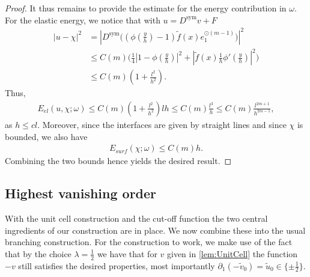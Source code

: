 \documentclass[a4paper, 10pt, twoside, notitlepage]{amsart}
\theoremstyle{plain}
\newcommand{\p}{\partial}
\newcommand{\Ds}{D^{\text{sym}}}
\begin{document}
\begin{proof}
			It thus remains to provide the estimate for the energy contribution in $\omega$.  For the elastic energy, we notice that with $u = \Ds v + F$
			\begin{align*}
                          |u - \chi|^2 &= \left|\Ds \Big((\phi(\frac{y}{h})-1)\tilde{f}(x) e_1^{\odot(m-1)}\Big) \right|^2 \\
                          &\leq C(m) \Big( \frac{1}{4} |1-\phi(\frac{y}{h})|^2 + |\tilde{f}(x) \frac{1}{h} \phi'(\frac{y}{h})|^2 \Big) \\
                          & \leq C(m)(1 + \frac{l^2}{h^{2}}).
			\end{align*}
			Thus,
			\begin{align*}
				E_{el}(u, \chi;\omega) \leq C(m) (1+\frac{l^2}{h^{2}}) l h \leq C(m) \frac{l^3}{h} \leq C(m) \frac{l^{2m+1}}{h^{2m-1}},
			\end{align*}
			as $h \leq c l$.  Moreover, since the interfaces are given by straight lines and since $\chi$ is bounded, we also have
			\begin{align*}
				E_{surf}(\chi;\omega) \leq C(m) h.
			\end{align*}
			Combining the two bounds hence yields the desired result.
		\end{proof}
		
		\subsection{Highest vanishing order}
		\label{sec:highest}
		
		With the unit cell construction and the cut-off function the two central ingredients of our construction are in place. We now combine these into the usual branching construction. For the construction to work, we make use of the fact that by the choice $\lambda = \frac{1}{2}$ we have that  for $v$ given in \cref{lem:UnitCell} the function $-v$ still satisfies the desired properties, most importantly $\p_1 (-\tilde{v}_0) = \tilde{u}_0 \in \{\pm \frac{1}{2}\}$.
		
\end{document}
